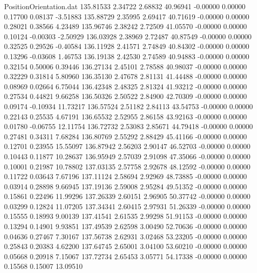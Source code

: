 \begin{filecontents}{PositionOrientation.dat}
 135.81533    2.34722    2.68832    40.96941   -0.00000    0.00000    0.17700    0.08137   -3.51883
 135.88729    2.35995    2.69417    40.71619   -0.00000    0.00000    0.28021    0.38566    4.23489
 135.96746    2.38242    2.72509    41.05570   -0.00000    0.00000    0.10124   -0.00303   -2.50929
 136.03928    2.38969    2.72487    40.87549   -0.00000    0.00000    0.32525    0.29526   -0.40584
 136.11928    2.41571    2.74849    40.84302   -0.00000    0.00000    0.13296   -0.03608    1.46753
 136.19138    2.42530    2.74589    40.94883   -0.00000    0.00000    0.32154    0.50006    0.39446
 136.27134    2.45101    2.78588    40.98037   -0.00000    0.00000    0.32229    0.31814    5.80960
 136.35130    2.47678    2.81131    41.44488   -0.00000    0.00000    0.08969    0.02664    6.75044
 136.42348    2.48325    2.81324    41.93212   -0.00000    0.00000    0.27534    0.44821    9.66258
 136.50326    2.50522    2.84900    42.70309   -0.00000    0.00000    0.09174   -0.10934   11.73217
 136.57524    2.51182    2.84113    43.54753   -0.00000    0.00000    0.22143    0.25535    4.67191
 136.65532    2.52955    2.86158    43.92163   -0.00000    0.00000    0.01780   -0.06755   12.11754
 136.72732    2.53083    2.85671    44.79418   -0.00000    0.00000    0.27481    0.34311    7.68284
 136.80769    2.55292    2.88429    45.41166   -0.00000    0.00000    0.12701    0.23955   15.55097
 136.87942    2.56203    2.90147    46.52703   -0.00000    0.00000    0.10443    0.11877   10.28637
 136.95949    2.57039    2.91098    47.35066   -0.00000    0.00000    0.10001    0.21987   10.78802
 137.03135    2.57758    2.92678    48.12592   -0.00000    0.00000    0.11722    0.03643    7.67196
 137.11124    2.58694    2.92969    48.73885   -0.00000    0.00000    0.03914    0.28898    9.66945
 137.19136    2.59008    2.95284    49.51352   -0.00000    0.00000    0.15861    0.22496   11.99296
 137.26339    2.60151    2.96905    50.37742   -0.00000    0.00000    0.03299    0.12824   11.07205
 137.34341    2.60415    2.97931    51.26339   -0.00000    0.00000    0.15555    0.18993    9.00139
 137.41541    2.61535    2.99298    51.91153   -0.00000    0.00000    0.13294    0.14901    9.93851
 137.49539    2.62598    3.00490    52.70636   -0.00000    0.00000    0.04636    0.27467    7.30167
 137.56738    2.62931    3.02468    53.23205   -0.00000    0.00000    0.25843    0.20383    4.62200
 137.64745    2.65001    3.04100    53.60210   -0.00000    0.00000    0.05668    0.20918    7.15067
 137.72734    2.65453    3.05771    54.17338   -0.00000    0.00000    0.15568    0.15007   13.09510

\end{filecontents}
